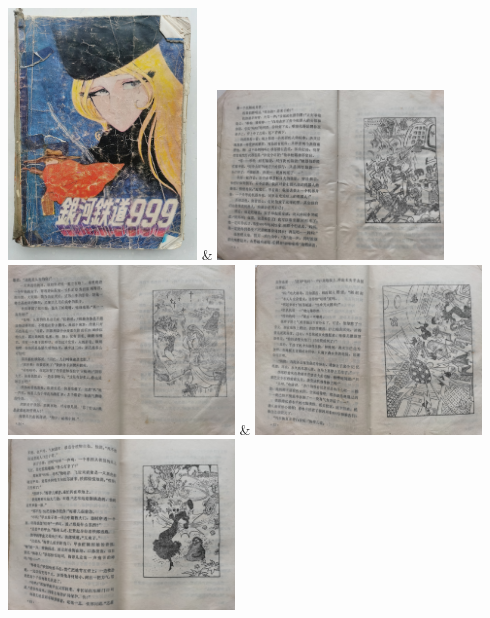 \begingroup
  \centering
  \begin{tblr}{}
    \includegraphics[width=5cm]{pic/银河列车-1.jpg}
      & \includegraphics[width=6cm]{pic/银河列车-2.jpg} \\
    \includegraphics[width=6cm]{pic/银河列车-3.jpg}
      & \includegraphics[width=6cm]{pic/银河列车-4.jpg} \\
    \includegraphics[width=6cm]{pic/银河列车-5.jpg}

\end{tblr}
